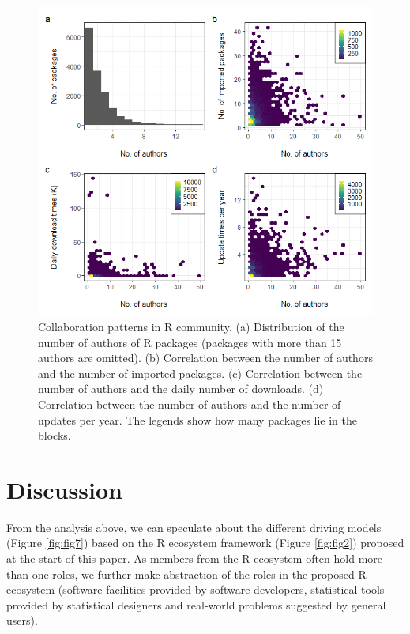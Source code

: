 \begin{Schunk}
\begin{figure}
\includegraphics[width=1\linewidth,height=0.5\textheight]{fig6} \caption[Collaboration patterns in R community]{Collaboration patterns in R community. (a) Distribution of the number of authors of R packages (packages with more than 15 authors are omitted). (b) Correlation between the number of authors and the number of imported packages. (c) Correlation between the number of authors and the daily number of downloads. (d) Correlation between the number of authors and the number of updates per year. The legends show how many packages lie in the blocks. }\label{fig:fig6}
\end{figure}
\end{Schunk}

\hypertarget{discussion}{%
\section{Discussion}\label{discussion}}

From the analysis above, we can speculate about the different driving
models (Figure \ref{fig:fig7}) based on the R ecosystem framework
(Figure \ref{fig:fig2}) proposed at the start of this paper. As members
from the R ecosystem often hold more than one roles, we further make
abstraction of the roles in the proposed R ecosystem (software
facilities provided by software developers, statistical tools provided
by statistical designers and real-world problems suggested by general
users).

